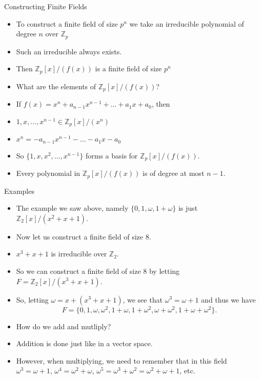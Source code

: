 \documentclass[ %
 10pt, xcolor={dvipsnames,svgnames,x11names,hyperref},
   hyperref={colorlinks=true,citecolor=green,linkcolor=DarkRed,urlcolor=ProcessBlue,anchorcolor=blue}
  ]{beamer}
\newenvironment{stepitemize}{\begin{itemize}[<+->]}{\end{itemize} }
\newcommand{\Z}{\mathbb{Z}}
\begin{document}
\begin{frame}{Constructing Finite Fields}
\begin{stepitemize}
    \item To construct a finite field of size $p^n$ we take an irreducible polynomial of degree $n$ over $\Z_p$
    \item Such an irreducible always exists.
    \item Then $\Z_p[x]/(f(x))$ is a finite field of size $p^n$
    \item What are the elements of $\Z_p[x]/(f(x))$?
    \item If $f(x)= x^n+a_{n-1}x^{n-1}+\dots+a_1x+a_0$, then
    \item $1, x, \dots, x^{n-1} \in \Z_p[x]/(x^n)$
    \item $x^n=-a_{n-1}x^{n-1}-\dots-a_1x-a_0$
    \item So $\{1, x, x^2, \dots, x^{n-1}\}$ forms a basis for $\Z_p[x]/(f(x))$.
    \item Every polynomial in $\Z_p[x]/(f(x))$ is of degree at most $n-1$.
\end{stepitemize}
\end{frame}

\begin{frame}{Examples}
\begin{stepitemize}
\item The example we saw above, namely $\{0,1,\omega, 1+\omega\}$ is just $\Z_2[x]/(x^2+x+1)$.
    \item Now let us construct a finite field of size $8$.
    \item $x^3+x+1$ is irreducible over $\Z_2$.
    \item So we can construct a finite field of size $8$ by letting $F= \Z_2[x]/(x^3+x+1)$.

    \item So, letting $\omega = x+(x^3+x+1)$, we see that $\omega^3=\omega+1$ and thus we have
    $$F = \{0,1, \omega, \omega ^2, 1+\omega, 1+\omega^2, \omega+\omega^2, 1+\omega+\omega^2\}.$$
    \item How do we add and mutliply?
    \item Addition is done just like in a vector space. \item However, when multiplying, we need to remember that in this field $\omega^3=\omega+1$, $\omega^4=\omega^2+\omega$, $\omega^5 = \omega^3+\omega^2= \omega^2+\omega+1$, etc.
\end{stepitemize}
\end{frame}
\end{document}
